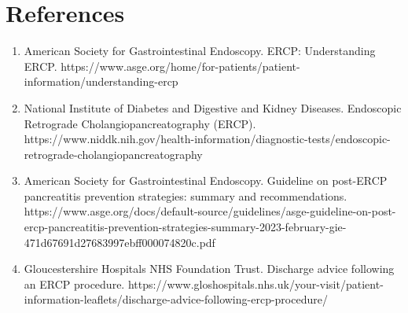 \section*{References}
\begin{enumerate}
  \item American Society for Gastrointestinal Endoscopy. ERCP: Understanding ERCP. https://www.asge.org/home/for-patients/patient-information/understanding-ercp
  \item National Institute of Diabetes and Digestive and Kidney Diseases. Endoscopic Retrograde Cholangiopancreatography (ERCP). https://www.niddk.nih.gov/health-information/diagnostic-tests/endoscopic-retrograde-cholangiopancreatography
  \item American Society for Gastrointestinal Endoscopy. Guideline on post-ERCP pancreatitis prevention strategies: summary and recommendations. https://www.asge.org/docs/default-source/guidelines/asge-guideline-on-post-ercp-pancreatitis-prevention-strategies-summary-2023-february-gie-471d67691d27683997ebff000074820c.pdf
  \item Gloucestershire Hospitals NHS Foundation Trust. Discharge advice following an ERCP procedure. https://www.gloshospitals.nhs.uk/your-visit/patient-information-leaflets/discharge-advice-following-ercp-procedure/
\end{enumerate}

\clearpage

